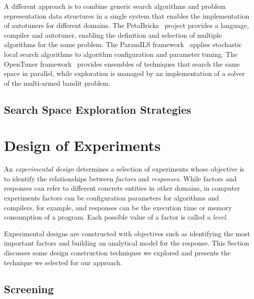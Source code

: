 \documentclass[conference]{IEEEtran}
\begin{document}
A different approach is to combine generic search algorithms and problem
representation data structures in a single system that enables the
implementation of autotuners for different domains. The
PetaBricks~\cite{ansel2009petabricks} project provides a language,
compiler and autotuner, enabling the definition and selection of multiple
algorithms for the same problem. The ParamILS
framework~\cite{hutter2009paramils} applies stochastic local search
algorithms to algorithm configuration and parameter tuning. The OpenTuner
framework~\cite{ansel2014opentuner} provides ensembles of techniques that
search the same space in parallel, while exploration is managed by an
implementation of a solver of the multi-armed bandit problem.
\subsection{Search Space Exploration Strategies}
\label{sec:org334d8b7}
\section{Design of Experiments}
\label{sec:org1b0fb7f}
An \emph{experimental design} determines a selection of experiments whose objective
is to identify the relationships between \emph{factors} and \emph{responses}. While
factors and responses can refer to different concrete entities in other domains,
in computer experiments factors can be configuration parameters for algorithms
and compilers, for example, and responses can be the execution time or memory
consumption of a program. Each possible value of a factor is called a \emph{level}.

Experimental designs are constructed with objectives such as identifying the
most important factors and building an analytical model for the response. This
Section discusses some design construction techniques we explored and presents
the technique we selected for our approach.
\subsection{Screening}
\label{sec:org7bbb4b5}
\end{document}
